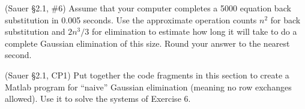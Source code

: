 \documentclass[12pt,fleqn]{exam}
\begin{document}
\begin{questions}

\question (Sauer \S2.1, \#6) Assume that your computer completes a 5000 equation back substitution in 0.005 seconds. Use the approximate operation counts $n^2$ for back substitution and $2n^3/3$ for elimination to estimate how long it will take to do a complete Gaussian elimination of this size. Round your answer to the nearest second.

\question (Sauer \S2.1, CP1) Put together the code fragments in this section to create a Matlab program for ``naive'' Gaussian elimination (meaning no row exchanges allowed). Use it to solve the systems of Exercise 6.

\end{questions}
\end{document}
